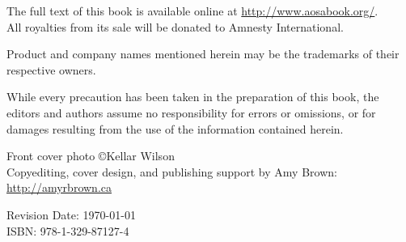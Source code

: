 \vspace{0.15cm}

\noindent
The full text of this book is available online at \url{http://www.aosabook.org/}.\\
All royalties from its sale will be donated to Amnesty International.\\

\vfill

\noindent Product and company names mentioned herein may be the trademarks of
their respective owners.\\

\vspace{0.15cm}

\noindent While every precaution has been taken in the preparation of this
book, the editors and authors assume no responsibility for errors or omissions,
or for damages resulting from the use of the information contained herein.\\

\vspace{0.15cm}

\noindent Front cover photo \copyright Kellar Wilson \\
\noindent Copyediting, cover design, and publishing support by Amy Brown: \url{http://amyrbrown.ca}

\vspace{1cm}

\noindent Revision Date: \today \\

\noindent ISBN: 978-1-329-87127-4
\normalsize

\newpage





